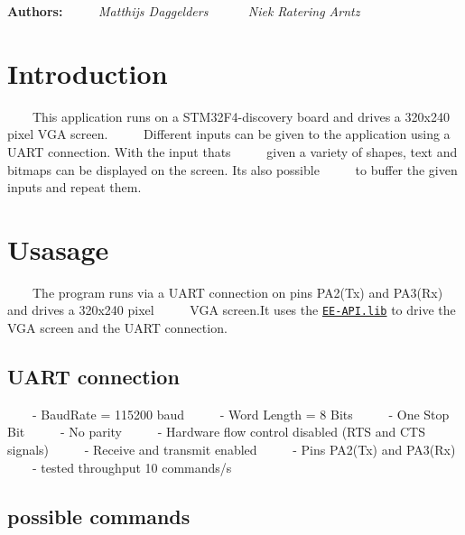 {\bfseries Authors\+:}~\newline
 ~~~~{\itshape  Matthijs Daggelders }~\newline
 ~~~~{\itshape  Niek Ratering Arntz }~\newline
\hypertarget{index_intro_sec}{}\section{Introduction}\label{index_intro_sec}
~~~~This application runs on a S\+T\+M32\+F4-\/discovery board and drives a 320x240 pixel V\+GA screen.~\newline
 ~~~~Different inputs can be given to the application using a U\+A\+RT connection. With the input thats~\newline
 ~~~~given a variety of shapes, text and bitmaps can be displayed on the screen. It\textquotesingle{}s also possible~\newline
 ~~~~to buffer the given inputs and repeat them.\hypertarget{index_usage_sec}{}\section{Usasage}\label{index_usage_sec}
~~~~The program runs via a U\+A\+RT connection on pins P\+A2(\+Tx) and P\+A3(\+Rx) and drives a 320x240 pixel~\newline
 ~~~~V\+GA screen.\+It uses the \href{}{\tt E\+E-\/\+A\+P\+I.\+lib} to drive the V\+GA screen and the U\+A\+RT connection.~\newline
\hypertarget{index_uart_sec}{}\subsection{U\+A\+R\+T connection}\label{index_uart_sec}
~~~~-\/ Baud\+Rate = 115200 baud~\newline
 ~~~~-\/ Word Length = 8 Bits~\newline
 ~~~~-\/ One Stop Bit~\newline
 ~~~~-\/ No parity~\newline
 ~~~~-\/ Hardware flow control disabled (R\+TS and C\+TS signals)~\newline
 ~~~~-\/ Receive and transmit enabled~\newline
 ~~~~-\/ Pins P\+A2(\+Tx) and P\+A3(\+Rx)~\newline
 ~~~~-\/ tested throughput 10 commands/s~\newline
\hypertarget{index_input_sec}{}\subsection{possible commands}\label{index_input_sec}
